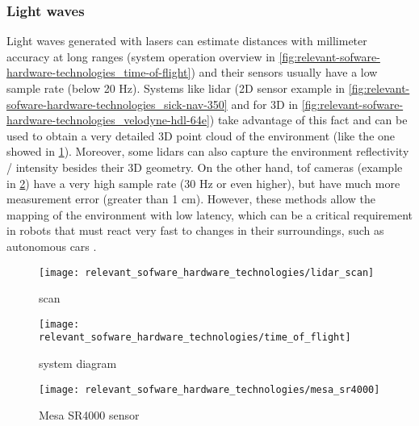 \subsubsection{Light waves}

Light waves generated with lasers can estimate distances with millimeter accuracy at long ranges (system operation overview in \cref{fig:relevant-sofware-hardware-technologies_time-of-flight}) and their sensors usually have a low sample rate (below 20 Hz). Systems like \gls{lidar} (2D sensor example in \cref{fig:relevant-sofware-hardware-technologies_sick-nav-350} and for 3D in \cref{fig:relevant-sofware-hardware-technologies_velodyne-hdl-64e}) take advantage of this fact and can be used to obtain a very detailed 3D point cloud of the environment (like the one showed in \cref{fig:relevant-sofware-hardware-technologies_lidar-scan}). Moreover, some \glspl{lidar} can also capture the environment reflectivity / intensity besides their 3D geometry. On the other hand, \gls{tof} cameras (example in \cref{fig:relevant-sofware-hardware-technologies_mesa-sr4000}) have a very high sample rate (30 Hz or even higher), but have much more measurement error (greater than 1 cm). However, these methods allow the mapping of the environment with low latency, which can be a critical requirement in robots that must react very fast to changes in their surroundings, such as autonomous cars \cite{Moras2010}.

\begin{figure}[H]
	\centering
	\texttt{[image: relevant\_sofware\_hardware\_technologies/lidar\_scan]}
	\caption[ scan]{ scan\protect\footnotemark}
	\label{fig:relevant-sofware-hardware-technologies_lidar-scan}
\end{figure}


\begin{savenotes}
\begin{figure}[H]
	\centering
	\begin{minipage}[h]{.47\textwidth}
		\centering
		\texttt{[image: relevant\_sofware\_hardware\_technologies/time\_of\_flight]}
		\caption[ system diagram]{ system diagram\protect\footnotemark}
		\label{fig:relevant-sofware-hardware-technologies_time-of-flight}
	\end{minipage}\hfill
{}
	\begin{minipage}[h]{.47\textwidth}
		\centering
		\texttt{[image: relevant\_sofware\_hardware\_technologies/mesa\_sr4000]}
		\caption[Mesa SR4000 sensor]{Mesa SR4000 sensor\protect\footnotemark}
		\label{fig:relevant-sofware-hardware-technologies_mesa-sr4000}
	\end{minipage}
\end{figure}
\end{savenotes}


